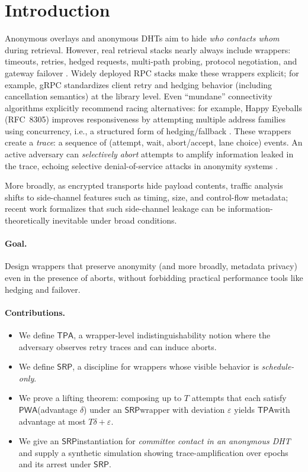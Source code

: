 \documentclass[11pt]{article}
\newcommand{\PWA}{\ensuremath{\mathsf{PWA}}}
\newcommand{\TPA}{\ensuremath{\mathsf{TPA}}}
\newcommand{\SRP}{\ensuremath{\mathsf{SRP}}}
\begin{document}
\section{Introduction}
Anonymous overlays and anonymous DHTs aim to hide \emph{who contacts whom} during retrieval.
However, real retrieval stacks nearly always include wrappers:
timeouts, retries, hedged requests, multi-path probing, protocol negotiation, and gateway failover \cite{deanBarrosoTailAtScale2013,primoracWhenToHedgeNSDI2021}.
Widely deployed RPC stacks make these wrappers explicit; for example, gRPC standardizes client retry and hedging behavior (including cancellation semantics) at the library level.\cite{grpcClientRetriesA6}
Even ``mundane'' connectivity algorithms explicitly recommend racing alternatives: for example, Happy Eyeballs (RFC~8305) improves responsiveness by attempting multiple address families using concurrency, i.e., a structured form of hedging/fallback \cite{rfc8305HappyEyeballs}.
These wrappers create a \emph{trace}: a sequence of (attempt, wait, abort/accept, lane choice) events.
An active adversary can \emph{selectively abort} attempts to amplify information leaked in the trace, echoing selective denial-of-service attacks in anonymity systems \cite{borisovDanezisMittalCCS2007,dasborisovSelectiveDoS2013,jansenPointBreak2019}.

More broadly, as encrypted transports hide payload contents, traffic analysis shifts to side-channel features such as timing, size, and control-flow metadata; recent work formalizes that such side-channel leakage can be information-theoretically inevitable under broad conditions.\cite{liuInevitabilitySideChannel2026}

\paragraph{Goal.}
Design wrappers that preserve anonymity (and more broadly, metadata privacy) even in the presence of aborts,
without forbidding practical performance tools like hedging and failover.

\paragraph{Contributions.}
\begin{itemize}[leftmargin=*]
  \item We define \TPA, a wrapper-level indistinguishability notion where the adversary observes retry traces and can induce aborts.
  \item We define \SRP, a discipline for wrappers whose visible behavior is \emph{schedule-only}.
  \item We prove a lifting theorem: composing up to $T$ attempts that each satisfy \PWA (advantage $\delta$) under an \SRP wrapper with deviation $\varepsilon$ yields \TPA with advantage at most $T\delta+\varepsilon$.
  \item We give an \SRP instantiation for \emph{committee contact in an anonymous DHT} and supply a synthetic simulation
        showing trace-amplification over epochs and its arrest under \SRP.
\end{itemize}
\end{document}
